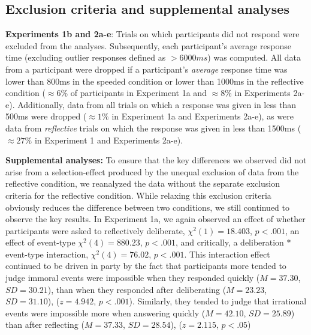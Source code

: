\documentclass[11pt,letterpaper]{article}
\begin{document}
\subsection*{Exclusion criteria and supplemental analyses} 

\textbf{Experiments 1b and 2a-e}: Trials on which participants did not respond were excluded from the analyses. Subsequently, each participant's average response time (excluding outlier responses defined as $>6000ms$) was computed. All data from a participant were dropped if a participant's \textit{average} response time was lower than 800ms in the speeded condition or lower than 1000ms in the reflective condition ($\approx6\%$ of participants in Experiment 1a and $\approx8\%$ in Experiments 2a-e). Additionally, data from all trials on which a response was given in less than 500ms were dropped ($\approx1\%$ in Experiment 1a and Experiments 2a-e), as were data from \textit{reflective} trials on which the response was given in less than 1500ms ($\approx27\%$ in Experiment 1 and Experiments 2a-e).
\vspace{5mm}

\noindent \textbf{Supplemental analyses:} To ensure that the key differences we observed did not arise from a selection-effect produced by the unequal exclusion of data from the reflective condition, we reanalyzed the data without the separate exclusion criteria for the reflective condition. While relaxing this exclusion criteria obviously reduces the difference between two conditions, we still continued to observe the key results. In Experiment 1a, we again observed an effect of whether participants were asked to reflectively deliberate, $\chi^2(1) = 18.403$, $p < .001$, an effect of event-type  $\chi^2(4) = 880.23$, $p < .001$, and critically, a deliberation $*$ event-type interaction, $\chi^2(4) = 76.02$, $p < .001$. This interaction effect continued to be driven in party by the fact that participants more tended to judge immoral events were impossible when they responded quickly ($M = 37.30$, $SD = 30.21$), than when they responded after deliberating ($M = 23.23$, $SD = 31.10$), ($z = 4.942$, $p < .001$). Similarly, they  tended to judge that irrational events were impossible more when answering quickly ($M = 42.10$, $SD = 25.89$) than after reflecting ($M = 37.33$, $SD = 28.54$), ($z = 2.115$, $p < .05$)
\end{document}
